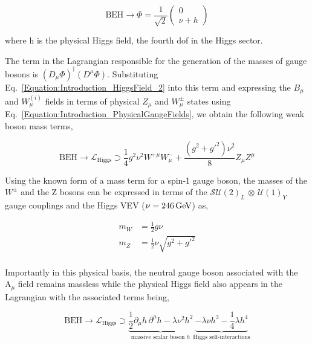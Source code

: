 \begin{equation}
    \text{BEH} \rightarrow \Phi = \frac{1}{\sqrt{2}}\begin{pmatrix}
        0 \\
        \nu + h
    \end{pmatrix} 
    \label{Equation:Introduction_HiggsField_2}
\end{equation}

where h is the physical Higgs field, the fourth dof in the Higgs sector.

The term in the Lagrangian responsible for the generation of the masses of gauge bosons is $(D_\mu\Phi)^\dagger(D^\mu\Phi)$. Substituting Eq.~\ref{Equation:Introduction_HiggsField_2} into this term and expressing the $B_\mu$ and $W_{\mu}^{(i)}$ fields in terms of physical $Z_\mu$ and $W_{\mu}^{\pm}$ states using Eq.~\ref{Equation:Introduction_PhysicalGaugeFields}, we obtain the following weak boson mass terms,

\begin{equation}
    \text{BEH} \rightarrow \mathcal{L}_{\text{Higgs}} \supset \frac{1}{4} g^2 \nu^2 W^{+\mu}W_{\mu}^- + \frac{(g^2+g'^2)\nu^2}{8} Z_\mu Z^\mu
\label{Equation:Introduction_HiggsLagrangian_2}
\end{equation}

Using the known form of a mass term for a spin-1 gauge boson, the masses of the $W^\pm$ and the Z bosons can be expressed in terms of the $\mathcal{SU}(2)_{L}$ $\otimes$ $\mathcal{U}(1)_{Y}$ gauge couplings and the Higgs VEV ($\nu = 246 \,\text{Ge\hspace{-.08em}V}$) as,

\begin{equation}
\begin{aligned}
    m_W &= \frac{1}{2}g\nu \\
    m_Z &= \frac{1}{2}\nu\sqrt{g^2+g'^2}\\
\end{aligned}
\end{equation}

Importantly in this physical basis, the neutral gauge boson associated with the $\text{A}_\mu$ field remains massless while the physical Higgs field also appears in the Lagrangian with the associated terms being,

\begin{equation}
    \text{BEH} \rightarrow \mathcal{L}_{\text{Higgs}} \supset \underbrace{\frac{1}{2} \partial_\mu h \, \partial^\mu h - \lambda \nu^2 h^2}_{\text{massive scalar boson } h}
    \underbrace{- \lambda \nu h^3 - \frac{1}{4} \lambda h^4}_{\text{Higgs self-interactions}}
\label{Equation:Introduction_HiggsLagrangian_3}
\end{equation}

